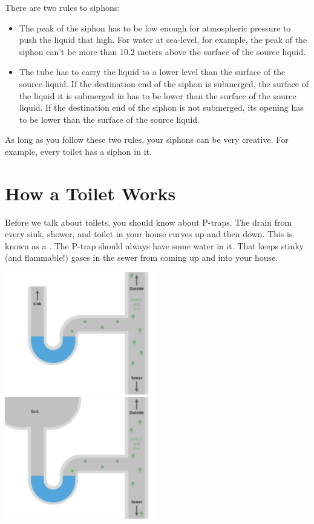 There are two rules to siphons:
\begin{itemize}
\item The peak of the siphon has to be low enough for atmospheric pressure to push the liquid that high.  For water at sea-level, for example,  the peak of the siphon can't be more than 10.2 meters above the surface of the source liquid. 

\item  The tube has to carry the liquid to a lower level than the surface of the source liquid.   If the destination end of the siphon is submerged,  the surface of the liquid it is submerged in has to be lower than the surface of the source liquid.  If the destination end of the siphon is not submerged,  its opening has to be lower than the surface of the source liquid.
\end{itemize}

As long as you follow these two rules,  your siphons can be very creative.  For example,  every toilet has a siphon in it.

\section{How a Toilet Works}

Before we talk about toilets,  you should know about P-traps.  The drain from every sink, shower, 
and toilet in your house curves up and then down.  This is known as a .   
The P-trap should always have some water in it.  That keeps stinky (and flammable!) gases 
in the sewer from coming up and into your house.  

\includegraphics[width=0.5\textwidth]{ptrap1.png}
\includegraphics[width=0.5\textwidth]{ptrap1b.png}


